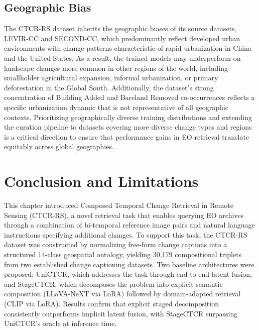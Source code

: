 \subsection{Geographic Bias}
\label{sec:chap7_impact_bias}
 
The CTCR-RS dataset inherits the geographic biases of its
source datasets, LEVIR-CC and SECOND-CC, which predominantly
reflect developed urban environments with change patterns
characteristic of rapid urbanization in China and the
United States. As a result, the trained models may
underperform on landscape changes more common in other
regions of the world, including smallholder agricultural
expansion, informal urbanization, or primary deforestation
in the Global South. Additionally, the dataset's strong
concentration of Building Added and Bareland Removed
co-occurrences reflects a specific urbanization dynamic
that is not representative of all geographic contexts.
Prioritizing geographically diverse training distributions
and extending the curation pipeline to datasets covering
more diverse change types and regions is a critical
direction to ensure that performance gains in EO retrieval
translate equitably across global geographies.
 
\section{Conclusion and Limitations}
\label{sec:chap7_conclusion}
 
This chapter introduced Composed Temporal Change Retrieval
in Remote Sensing (CTCR-RS), a novel retrieval task that
enables querying EO archives through a combination of
bi-temporal reference image pairs and natural language
instructions specifying additional changes. To support this
task, the CTCR-RS dataset was constructed by normalizing
free-form change captions into a structured 14-class
geospatial ontology, yielding 30,179 compositional triplets
from two established change captioning datasets. Two
baseline architectures were proposed: UniCTCR, which
addresses the task through end-to-end latent fusion, and
StageCTCR, which decomposes the problem into explicit
semantic composition (LLaVA-NeXT via LoRA) followed by
domain-adapted retrieval (CLIP via LoRA). Results
confirm that explicit staged decomposition consistently
outperforms implicit latent fusion, with StageCTCR
surpassing UniCTCR's oracle at inference time.
 

